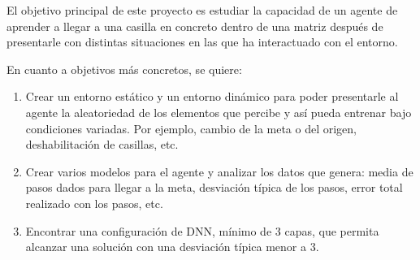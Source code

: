 El objetivo principal de este proyecto es estudiar la capacidad de un agente de aprender a llegar a una casilla en concreto dentro de una matriz después de presentarle con distintas situaciones en las que ha interactuado con el entorno. 

En cuanto a objetivos más concretos, se quiere:

\begin{enumerate}
    \item Crear un entorno estático y un entorno dinámico para poder presentarle al agente la aleatoriedad de los elementos que percibe y así pueda entrenar bajo condiciones variadas. Por ejemplo, cambio de la meta o del origen, deshabilitación de casillas, etc. 
    
    \item Crear varios modelos para el agente y analizar los datos que genera: media de pasos dados para llegar a la meta, desviación típica de los pasos, error total realizado con los pasos, etc. 
    
    \item Encontrar una configuración de DNN, mínimo de 3 capas, que permita alcanzar una solución con una desviación típica menor a 3. 
    
\end{enumerate}